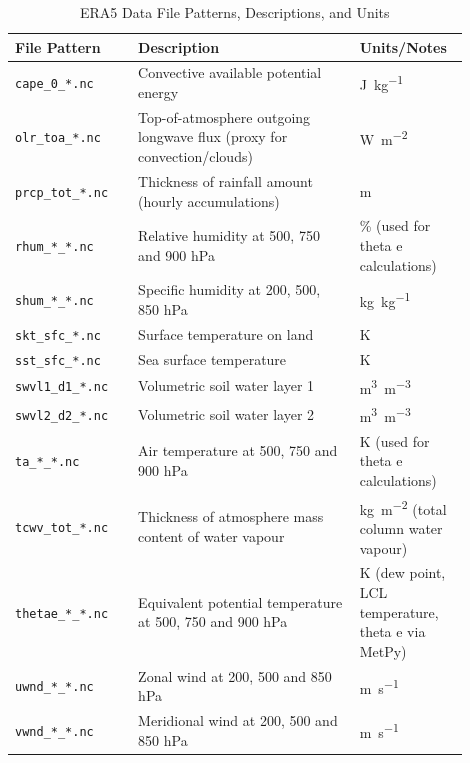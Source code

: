 \begin{table}[ht]
    \centering
    \caption{ERA5 Data File Patterns, Descriptions, and Units}
    \label{tab:era5-file-patterns}
    \begin{tabular}{p{0.25\linewidth} p{0.45\linewidth} p{0.2\linewidth}}
        \toprule
        File Pattern & Description & Units/Notes \\
        \midrule
        \texttt{cape\_0\_*.nc} & Convective available potential energy & \unit{\joule\per\kilogram} \\
        \texttt{olr\_toa\_*.nc} & Top-of-atmosphere outgoing longwave flux (proxy for convection/clouds) & \unit{\watt\per\meter\squared} \\
        \texttt{prcp\_tot\_*.nc} & Thickness of rainfall amount (hourly accumulations) & \unit{\meter} \\
        \texttt{rhum\_*\_*.nc} & Relative humidity at 500, 750 and 900 \unit{\hecto\pascal} & \unit{\percent} (used for theta e calculations) \\
        \texttt{shum\_*\_*.nc} & Specific humidity at 200, 500, 850 \unit{\hecto\pascal} & \unit{\kilogram\per\kilogram} \\
        \texttt{skt\_sfc\_*.nc} & Surface temperature on land & \unit{\kelvin} \\
        \texttt{sst\_sfc\_*.nc} & Sea surface temperature & \unit{\kelvin} \\
        \texttt{swvl1\_d1\_*.nc} & Volumetric soil water layer 1 & \unit{\meter\cubed\per\meter\cubed} \\
        \texttt{swvl2\_d2\_*.nc} & Volumetric soil water layer 2 & \unit{\meter\cubed\per\meter\cubed} \\
        \texttt{ta\_*\_*.nc} & Air temperature at 500, 750 and 900 \unit{\hecto\pascal} & \unit{\kelvin} (used for theta e calculations) \\
        \texttt{tcwv\_tot\_*.nc} & Thickness of atmosphere mass content of water vapour & \unit{\kilogram\per\meter\squared} (total column water vapour) \\
        \texttt{thetae\_*\_*.nc} & Equivalent potential temperature at 500, 750 and 900 \unit{\hecto\pascal} & \unit{\kelvin} (dew point, LCL temperature, theta e via MetPy) \\
        \texttt{uwnd\_*\_*.nc} & Zonal wind at 200, 500 and 850 \unit{\hecto\pascal} & \unit{\meter\per\second} \\
        \texttt{vwnd\_*\_*.nc} & Meridional wind at 200, 500 and 850 \unit{\hecto\pascal} & \unit{\meter\per\second} \\
        \bottomrule
    \end{tabular}
\end{table}


